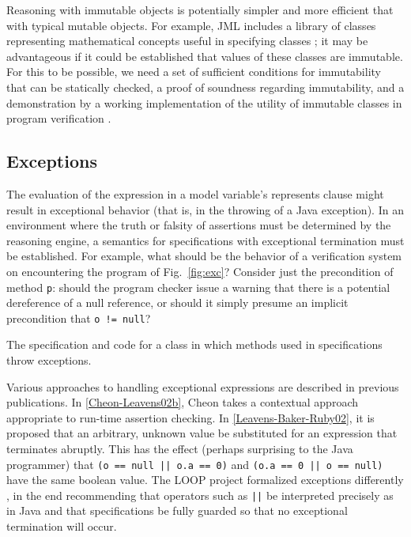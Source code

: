 \documentclass{sig-alternate}
\begin{document}
Reasoning with immutable objects is potentially simpler and more efficient that with typical
mutable objects.  For example, JML includes a library of classes representing mathematical 
concepts useful in specifying classes \cite{Leavens-etal03a}; 
it may be advantageous if it could be 
established that values of these classes are immutable.  For this to be possible, we need 
a set of sufficient conditions for immutability that can be statically checked, a proof of 
soundness regarding immutability, and a demonstration by a working implementation
of the utility of immutable classes in program verification .


\subsection{Exceptions}

The evaluation of the expression in a model variable's represents clause might result in
exceptional behavior (that is, in the throwing of a Java exception).  In an environment
where the truth or falsity of assertions must be determined by the reasoning engine, a
semantics for specifications with exceptional termination must be established.  For example,
what should be the behavior of a verification system on encountering the program of 
Fig.~\ref{fig:exc}?  Consider just the precondition of method \texttt{p}: should the program 
checker issue a warning that there is a potential dereference of a null reference, or should it
simply presume an implicit precondition that \texttt{o != null}?

\begin{BFIGURE}

\caption{The specification and code for a class in which methods used in specifications throw exceptions.}
\label{fig:norep}
\end{BFIGURE}

Various approaches to handling exceptional expressions are described in previous 
publications.
In \ref{Cheon-Leavens02b}, Cheon takes a contextual approach appropriate to run-time 
assertion checking.   In \ref{Leavens-Baker-Ruby02}, it is proposed that 
an arbitrary, unknown value be substituted for an expression that terminates abruptly.
This has the effect (perhaps surprising to the Java programmer) that
\texttt{(o == null || o.a == 0)} and \texttt{(o.a == 0 || o == null)} have the same boolean value.
The LOOP project formalized exceptions differently \cite{BergPJ00a}, in the end recommending
that operators such as \texttt{||} be interpreted precisely as in Java and that specifications be
fully guarded so that no exceptional termination will occur.
\end{document}
